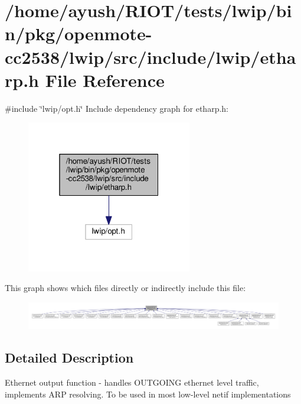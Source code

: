 \hypertarget{openmote-cc2538_2lwip_2src_2include_2lwip_2etharp_8h}{}\section{/home/ayush/\+R\+I\+O\+T/tests/lwip/bin/pkg/openmote-\/cc2538/lwip/src/include/lwip/etharp.h File Reference}
\label{openmote-cc2538_2lwip_2src_2include_2lwip_2etharp_8h}
{\ttfamily \#include \char`\"{}lwip/opt.\+h\char`\"{}}\newline
Include dependency graph for etharp.\+h\+:
\nopagebreak
\begin{figure}[H]
\begin{center}
\leavevmode
\includegraphics[width=205pt]{openmote-cc2538_2lwip_2src_2include_2lwip_2etharp_8h__incl}
\end{center}
\end{figure}
This graph shows which files directly or indirectly include this file\+:
\nopagebreak
\begin{figure}[H]
\begin{center}
\leavevmode
\includegraphics[width=350pt]{openmote-cc2538_2lwip_2src_2include_2lwip_2etharp_8h__dep__incl}
\end{center}
\end{figure}


\subsection{Detailed Description}
Ethernet output function -\/ handles O\+U\+T\+G\+O\+I\+NG ethernet level traffic, implements A\+RP resolving. To be used in most low-\/level netif implementations 